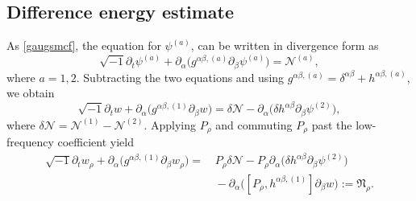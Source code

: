 \documentclass[11pt,letterpaper,reqno]{amsart}
\numberwithin{equation}{section}
\theoremstyle{definition}
\theoremstyle{remark}
\begin{document}
 





\subsection{Difference energy estimate} \label{subsec:diff.en}
As \eqref{gaugsmcf}, the equation for \(\psi^{(a)}\), can be written in divergence form as
\[
\sqrt{-1}\partial_t\psi^{(a)}
+\partial_\alpha\big(g^{\alpha\beta,(a)}\partial_\beta\psi^{(a)}\big)
=\mathcal{N}^{(a)},
\]
where \(a=1,2\).
Subtracting the two equations and using \(g^{\alpha\beta,(a)}=\delta^{\alpha\beta}+h^{\alpha\beta,(a)}\), we obtain
\[
\sqrt{-1}\partial_t w
+\partial_\alpha\big(g^{\alpha\beta,(1)}\partial_\beta w\big)
 =
  \delta \mathcal{N}-
\partial_\alpha\big(\delta h^{\alpha\beta}\partial_\beta\psi^{(2)}\big),
\]
where
\(
\delta \mathcal{N}=\mathcal{N}^{(1)}-\mathcal{N}^{(2)}.
\)
Applying \(P_\rho\) and commuting \(P_\rho\) past the low-frequency coefficient yield
 \begin{align}
   \sqrt{-1}\partial_t w_\rho
+\partial_\alpha\big(g^{\alpha\beta,(1)}\partial_\beta w_\rho\big)
= &\,P_\rho\delta \mathcal{N}
-P_\rho\partial_\alpha
\big(\delta h^{\alpha\beta}\partial_\beta\psi^{(2)}\big) \label{eq:diff} \\
&\, -\partial_\alpha\big([P_\rho,h^{\alpha\beta,(1)}]\partial_\beta w\big):=\mathfrak{N}_\rho.\nonumber
 \end{align}
\end{document}
